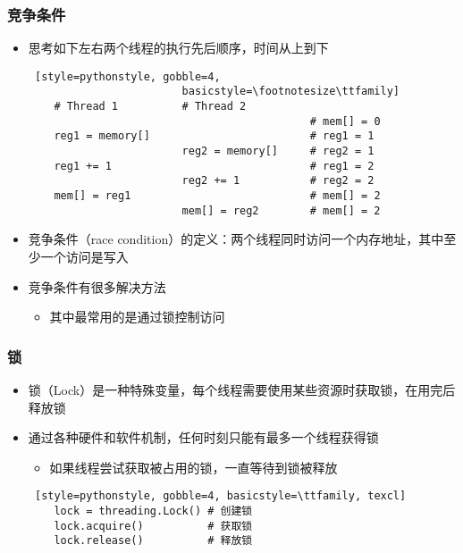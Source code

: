 \begin{frame}[fragile]
	\frametitle{竞争条件}
	\begin{itemize}
	\item 思考如下左右两个线程的执行先后顺序，时间从上到下
	\begin{lstlisting} [style=pythonstyle, gobble=4,
						basicstyle=\footnotesize\ttfamily]
	# Thread 1			# Thread 2
											# mem[] = 0
	reg1 = memory[]							# reg1 = 1
						reg2 = memory[]		# reg2 = 1
	reg1 += 1								# reg1 = 2
						reg2 += 1			# reg2 = 2
	mem[] = reg1							# mem[] = 2
						mem[] = reg2		# mem[] = 2
	\end{lstlisting}
	\item 竞争条件（race
			condition）的定义：两个线程同时访问一个内存地址，其中至少一个访问是写入
	\item 竞争条件有很多解决方法
		\begin{itemize}
		\item 其中最常用的是通过锁控制访问
		\end{itemize}
	\end{itemize}
\end{frame}

\begin{frame}[fragile]
	\frametitle{锁}
	\begin{itemize}
	\item 锁（Lock）是一种特殊变量，每个线程需要使用某些资源时获取锁，在用完后释放锁
	\item 通过各种硬件和软件机制，任何时刻只能有最多一个线程获得锁
		\begin{itemize}
		\item 如果线程尝试获取被占用的锁，一直等待到锁被释放
		\end{itemize}
	\begin{lstlisting} [style=pythonstyle, gobble=4, basicstyle=\ttfamily, texcl]
	lock = threading.Lock()	# 创建锁
	lock.acquire()			# 获取锁
	lock.release()			# 释放锁
	\end{lstlisting}
	\end{itemize}
\end{frame}

